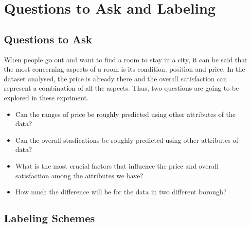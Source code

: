 \documentclass[12pt]{article}
\begin{document}
\section{Questions to Ask and Labeling}
\subsection{Questions to Ask}

When people go out and want to find a room to stay in a city, it can be said that the most concerning aspects of a room is its condition, position and price. In the dataset analysed, the price is already there and the overall satisfaction can represent a combination of all the aspects. Thus, two questions are going to be explored in these expriment.
\begin{itemize}
\item Can the ranges of price be roughly predicted using other attributes of the data?
\item Can the overall stasfications be roughly predicted using other attributes of data?
\item What is the most crucial factors that influence the price and overall satisfaction among the attributes we have?

\item How much the difference will be for the data in two different borough?
\end{itemize}
\subsection{Labeling Schemes}
\end{document}
